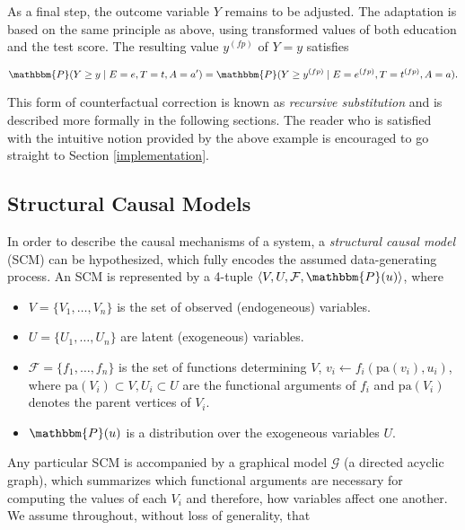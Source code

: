 \documentclass[
  nojss]{jss}
\providecommand{\tightlist}{%
  \setlength{\itemsep}{0pt}\setlength{\parskip}{0pt}}
\begin{document}
As a final step, the outcome variable \(Y\) remains to be adjusted. The
adaptation is based on the same principle as above, using transformed
values of both education and the test score. The resulting value
\( {y}^{(fp)}\) of \(Y = y\) satisfies

\begin{equation} \label{eq:labeltransform}
    \mathbbm{P}(Y \geq y \mid E = e, T = t, A = a') = \mathbbm{P}(Y \geq  {y}^{(fp)} \mid E =  {e}^{(fp)}, T =  {t}^{(fp)}, A = a).
\end{equation}

This form of counterfactual correction is known as \emph{recursive
substitution} \citep[Chapter~7]{pearl2009causality} and is described
more formally in the following sections. The reader who is satisfied
with the intuitive notion provided by the above example is encouraged to
go straight to Section \ref{implementation}.

\hypertarget{structural-causal-models}{%
\subsection{Structural Causal Models}\label{structural-causal-models}}

In order to describe the causal mechanisms of a system, a
\emph{structural causal model} (SCM) can be hypothesized, which fully
encodes the assumed data-generating process. An SCM is represented by a
4-tuple \(\langle V, U, \mathcal{F}, \mathbbm{P}(u) \rangle\), where

\begin{itemize}
\tightlist
\item
  \(V = \lbrace V_1, \ldots, V_n \rbrace\) is the set of observed
  (endogeneous) variables.
\item
  \(U = \lbrace U_1, \ldots, U_n \rbrace\) are latent (exogeneous)
  variables.
\item
  \(\mathcal{F} = \lbrace f_1, \ldots, f_n \rbrace\) is the set of
  functions determining \(V\), \(v_i \gets f_i(\mathrm{pa}(v_i), u_i)\),
  where \(\mathrm{pa}(V_i) \subset V, U_i \subset U\) are the functional
  arguments of \(f_i\) and \(\mathrm{pa}(V_i)\) denotes the parent
  vertices of \(V_i\).
\item
  \(\mathbbm{P}(u)\) is a distribution over the exogeneous variables
  \(U\).
\end{itemize}

Any particular SCM is accompanied by a graphical model \(\mathcal{G}\)
(a directed acyclic graph), which summarizes which functional arguments
are necessary for computing the values of each \(V_i\) and therefore,
how variables affect one another. We assume throughout, without loss of
generality, that
\end{document}
